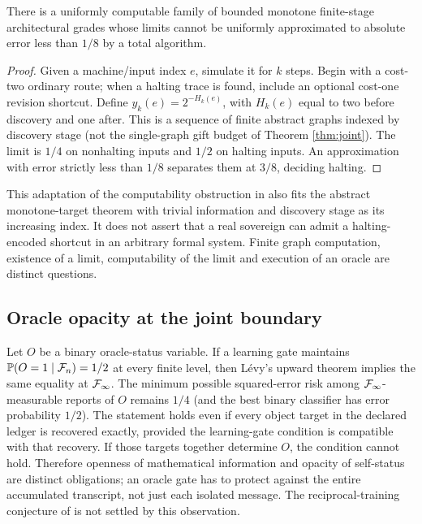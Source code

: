 \documentclass[11pt]{article}
\begin{document}
\begin{proposition}
There is a uniformly computable family of bounded monotone finite-stage architectural grades whose limits cannot be uniformly approximated to absolute error less than $1/8$ by a total algorithm.
\end{proposition}
\begin{proof}Given a machine/input index $e$, simulate it for $k$ steps. Begin with a cost-two ordinary route; when a halting trace is found, include an optional cost-one revision shortcut. Define $y_k(e)=2^{-H_k(e)}$, with $H_k(e)$ equal to two before discovery and one after. This is a sequence of finite abstract graphs indexed by discovery stage (not the single-graph gift budget of Theorem \ref{thm:joint}). The limit is $1/4$ on nonhalting inputs and $1/2$ on halting inputs. An approximation with error strictly less than $1/8$ separates them at $3/8$, deciding halting.\end{proof}
This adaptation of the computability obstruction in \cite{professor} also fits the abstract monotone-target theorem with trivial information and discovery stage as its increasing index. It does not assert that a real sovereign can admit a halting-encoded shortcut in an arbitrary formal system. Finite graph computation, existence of a limit, computability of the limit and execution of an oracle are distinct questions.

\subsection{Oracle opacity at the joint boundary}
Let $O$ be a binary oracle-status variable. If a learning gate maintains $\mathbb P(O=1\mid\mathcal F_n)=1/2$ at every finite level, then L\'evy's upward theorem implies the same equality at $\mathcal F_\infty$. The minimum possible squared-error risk among $\mathcal F_\infty$-measurable reports of $O$ remains $1/4$ (and the best binary classifier has error probability $1/2$). The statement holds even if every object target in the declared ledger is recovered exactly, provided the learning-gate condition is compatible with that recovery. If those targets together determine $O$, the condition cannot hold. Therefore openness of mathematical information and opacity of self-status are distinct obligations; an oracle gate has to protect against the entire accumulated transcript, not just each isolated message. The reciprocal-training conjecture of \cite{creative} is not settled by this observation.
\end{document}
